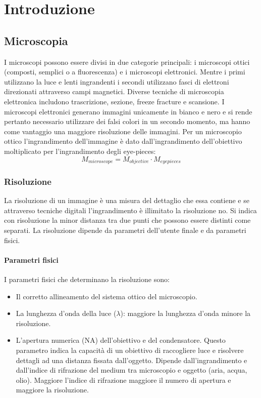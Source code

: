 \chapter{Introduzione}
\section{Microscopia}
I microscopi possono essere divisi in due categorie principali: i microscopi ottici (composti, semplici o a fluorescenza) e i microscopi elettronici. Mentre
i primi utilizzano la luce e lenti ingrandenti i secondi utilizzano fasci di elettroni direzionati attraverso campi magnetici. Diverse tecniche di 
microscopia elettronica includono trascrizione, sezione, freeze fracture e scansione. I microscopi elettronici generano immagini unicamente in bianco e nero
e si rende pertanto necessario utilizzare dei falsi colori in un secondo momento, ma hanno come vantaggio una maggiore risoluzione delle immagini. Per un
microscopio ottico l'ingrandimento dell'immagine \`e dato dall'ingrandimento dell'obiettivo moltiplicato per l'ingrandimento degli eye-pieces: 
$$M_{microscope} = M_{objective}\cdot M_{eyepieces}$$
\subsection{Risoluzione}
La risoluzione di un immagine \`e una misura del dettaglio che essa contiene e se attraverso tecniche digitali l'ingrandimento \`e illimitato la risoluzione
no. Si indica con risoluzione la minor distanza tra due punti che possono essere distinti come separati. La risoluzione dipende da parametri dell'utente 
finale e da parametri fisici. 
\subsubsection{Parametri fisici}
I parametri fisici che determinano la risoluzione sono:
\begin{itemize}
\item Il corretto allineamento del sistema ottico del microscopio.
\item La lunghezza d'onda della luce ($\lambda$): maggiore la lunghezza d'onda minore la risoluzione.
\item L'apertura numerica (NA) dell'obiettivo e del condensatore. Questo parametro indica la capacit\`a di un obiettivo di raccogliere luce e risolvere 
dettagli ad una distanza fissata dall'oggetto. Dipende dall'ingrandimento e dall'indice di rifrazione del medium tra microscopio e oggetto (aria, acqua, 
olio). Maggiore l'indice di rifrazione maggiore il numero di apertura e maggiore la risoluzione.
\end{itemize}
